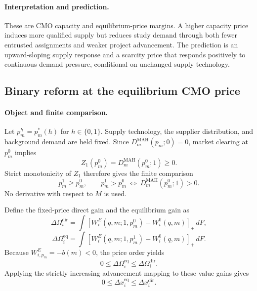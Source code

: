 \paragraph{Interpretation and prediction.}
These are CMO capacity and equilibrium-price margins. A higher capacity price
induces more qualified supply but reduces study demand through both fewer
entrusted assignments and weaker project advancement. The prediction is an
upward-sloping supply response and a scarcity price that responds positively
to continuous demand pressure, conditional on unchanged supply technology.

\subsection{Binary reform at the equilibrium CMO price}
\label{subsec:p15-equilibrium-policy}

\paragraph{Object and finite comparison.}
Let \(p_m^h=p_m^*(h)\) for \(h\in\{0,1\}\). Supply technology, the supplier
distribution, and background demand are held fixed. Since
\(D_m^{\mathrm{MAH}}(p_m;0)=0\), market clearing at \(p_m^0\) implies
\[
  Z_1(p_m^0)=D_m^{\mathrm{MAH}}(p_m^0;1)\geq0.
\]
Strict monotonicity of \(Z_1\) therefore gives the finite comparison
\begin{equation}
  p_m^1\geq p_m^0,
  \qquad
  p_m^1>p_m^0
  \ \Longleftrightarrow\
  D_m^{\mathrm{MAH}}(p_m^0;1)>0.
  \label{eq:p15-equilibrium-price-order}
\end{equation}
No derivative with respect to \(M\) is used.

Define the fixed-price direct gain and the equilibrium gain as
\[
  \Delta\Omega_i^{\mathrm{dir}}
  =
  \int[W_i^E(q,m;1,p_m^0)-W_i^0(q,m)]_+\,dF,
\]
\[
  \Delta\Omega_i^{\mathrm{eq}}
  =
  \int[W_i^E(q,m;1,p_m^1)-W_i^0(q,m)]_+\,dF.
\]
Because \(W_{i,p_m}^E=-b(m)<0\), the price order yields
\begin{equation}
  0\leq\Delta\Omega_i^{\mathrm{eq}}
  \leq\Delta\Omega_i^{\mathrm{dir}}.
  \label{eq:p15-value-attenuation}
\end{equation}
Applying the strictly increasing advancement mapping to these value gains
gives
\begin{equation}
  0\leq\Delta x_i^{\mathrm{eq}}
  \leq\Delta x_i^{\mathrm{dir}}.
  \label{eq:p15-advancement-attenuation}
\end{equation}

